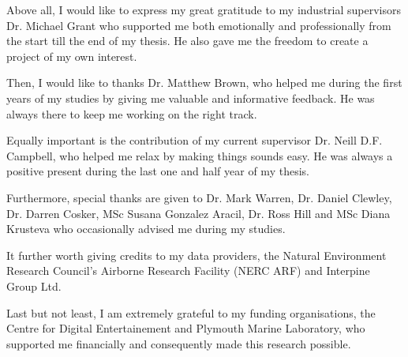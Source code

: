 \documentclass{subfiles}
\begin{document}
	\par Above all, I would like to express my great gratitude to my industrial supervisors Dr. Michael Grant who supported me both emotionally and professionally from the start till the end of my thesis. He also gave me the freedom to create a project of my own interest.
	
	\par Then, I would like to thanks Dr. Matthew Brown, who helped me during the first years of my studies by giving me valuable and informative feedback. He was always there to keep me working on the right track. 
	
	\par Equally important is the contribution of my current supervisor Dr. Neill D.F. Campbell, who helped me relax by making things sounds easy. He was always a positive present during the last one and half year of my thesis.
	
	\par Furthermore, special thanks are given to Dr. Mark Warren, Dr.  Daniel Clewley, Dr. Darren Cosker, MSc Susana Gonzalez Aracil, Dr. Ross Hill and MSc Diana Krusteva who occasionally advised me during my studies. 
	
	\par It further worth giving credits to my data providers, the Natural Environment Research Council’s Airborne Research Facility (NERC ARF) and Interpine Group Ltd. 
	
	\par Last but not least, I am extremely grateful to my funding organisations, the Centre for Digital Entertainement and Plymouth Marine Laboratory, who supported me financially and consequently made this research possible. 
	

	
\end{document}
